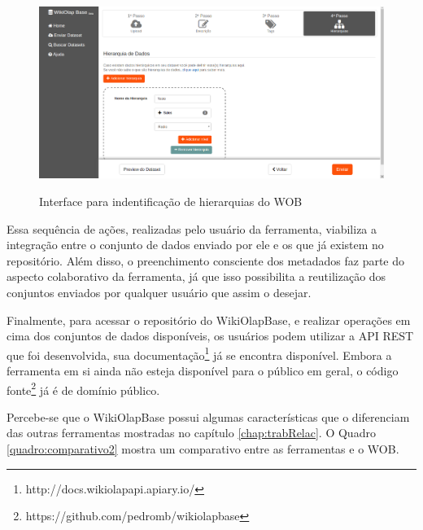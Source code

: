 \begin{figure}[!htb]
    \centering
    \caption{Interface para indentificação de hierarquias do WOB}
    \includegraphics[width=1\textwidth]{./04-figuras/wob-hierarquia}
    \label{fig:wob-hierarquia}
\end{figure}

Essa sequência de ações, realizadas pelo usuário da ferramenta, viabiliza a integração entre
o conjunto de dados enviado por ele e os que já existem no repositório. Além disso, o 
preenchimento consciente dos metadados faz parte do aspecto colaborativo da ferramenta, 
já que isso possibilita a reutilização dos conjuntos enviados por qualquer usuário que 
assim o desejar.

Finalmente, para acessar o repositório do WikiOlapBase, e realizar operações em cima dos 
conjuntos de dados disponíveis, os usuários podem utilizar a API REST que foi desenvolvida, 
sua documentação\footnote{http://docs.wikiolapapi.apiary.io/} já se encontra disponível. 
Embora a ferramenta em si ainda não esteja disponível para o público em geral, o código 
fonte\footnote{https://github.com/pedromb/wikiolapbase} já é de domínio público.

Percebe-se que o WikiOlapBase possui algumas características que o diferenciam das outras ferramentas
mostradas no capítulo \ref{chap:trabRelac}. O Quadro \ref{quadro:comparativo2} mostra um 
comparativo entre as ferramentas e o WOB.

